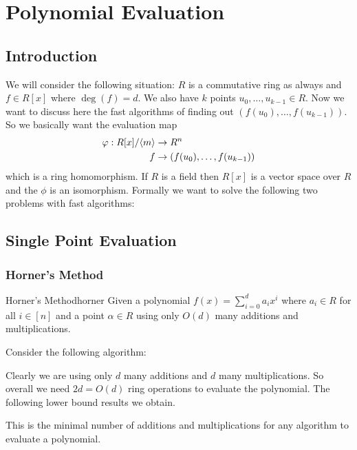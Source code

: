 \chapter{Polynomial Evaluation}
\section{Introduction}
We will consider the following situation: $R$ is a commutative ring  as always and $f\in R[x]$ where $\deg(f)=d$. We also have $k$ points $u_0,\dots, u_{k-1}\in R$. Now we want to discuss here the fast algorithms of finding out $(f(u_0),\dots, f(u_{k-1}))$. So we basically want the evaluation map 
\begin{align*}
		\varphi: R[x]/\langle m\rangle & \to R^n\\ f & \to (f(u_0),\dots, f(u_{k-1}))
\end{align*}which is a ring homomorphism. If $R$ is a field then $R[x]$ is a vector space over $R$ and the $\phi$ is an isomorphism. Formally we want to solve the following two problems with fast algorithms:
\pagebreak

\section{Single Point Evaluation}
\subsection{Horner's Method}
\begin{Theorem}{Horner's Method}{horner}
	Given a polynomial $f(x)=\sum\limits_{i=0}^d a_ix^i$ where $a_i\in R$ for all $i\in [n]$ and a point $\alpha\in R$ using only $O(d)$ many additions and multiplications.
\end{Theorem}


\begin{myproof}Consider the following algorithm:
	
	
	Clearly we are using only $d$ many additions and $d$ many multiplications. So overall we need $2d=O(d)$ ring operations to evaluate the polynomial. The following lower bound results we obtain.
\end{myproof}
This is the minimal number of additions and multiplications for any algorithm to evaluate a polynomial.

